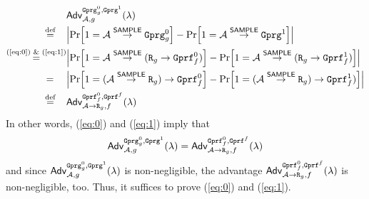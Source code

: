 \documentclass[a4paper,table,dvipsnames]{article}
\theoremstyle{definition}
\newcommand{\M}[1]{\ensuremath{\text{\texttt{#1}}}}
\renewcommand{\O}[1]{\ensuremath{\mathsf{#1}}}
\begin{document}
\begin{align*}
&\mathsf{Adv}^{\M{Gprg}_g^0,\M{Gprg}^1}_{\adv,g}(\lambda)\\
\stackrel{\text{def}}{=}\;\;\;\;  &\abs{\prob{1=\adv\stackrel{\O{SAMPLE}}{\rightarrow}\M{Gprg}_g^0}
                                                           -\prob{1=\adv\stackrel{\O{SAMPLE}}{\rightarrow}\M{Gprg}^1}}\\
\stackrel{\text{(\ref{eq:0}) \& (\ref{eq:1})}}{=}
  &\abs{\prob{1=\adv\stackrel{\O{SAMPLE}}{\rightarrow}(\M{R}_g\rightarrow\M{Gprf}_f^0)}
                                                           -\prob{1=\adv\stackrel{\O{SAMPLE}}{\rightarrow}(\M{R}_g\rightarrow\M{Gprf}_f^1)}}\\
 =\;\;\;\;\, &\abs{\prob{1=(\adv\stackrel{\O{SAMPLE}}{\rightarrow}\M{R}_g)\rightarrow\M{Gprf}_f^0}
                                                           -\prob{1=(\adv\stackrel{\O{SAMPLE}}{\rightarrow}\M{R}_g)\rightarrow\M{Gprf}_f^1)}}\\
\stackrel{\text{def}}{=}\;\;\;\;&\mathsf{Adv}^{\M{Gprf}_f^0,\M{Gprf}^f}_{\adv\rightarrow\M{R}_g,f}(\lambda)
\end{align*}
In other words, (\ref{eq:0}) and (\ref{eq:1}) imply that
\[\mathsf{Adv}^{\M{Gprg}_g^0,\M{Gprg}^1}_{\adv,g}(\lambda)=\mathsf{Adv}^{\M{Gprf}_f^0,\M{Gprf}^f}_{\adv\rightarrow\M{R}_g,f}(\lambda)\]
and since $\mathsf{Adv}^{\M{Gprg}_g^0,\M{Gprg}^1}_{\adv,g}(\lambda)$ is non-negligible, the advantage $\mathsf{Adv}^{\M{Gprf}_f^0,\M{Gprf}^f}_{\adv\rightarrow\M{R}_g,f}(\lambda)$
is non-negligible, too. Thus, it suffices to prove (\ref{eq:0}) and (\ref{eq:1}).
\end{document}
